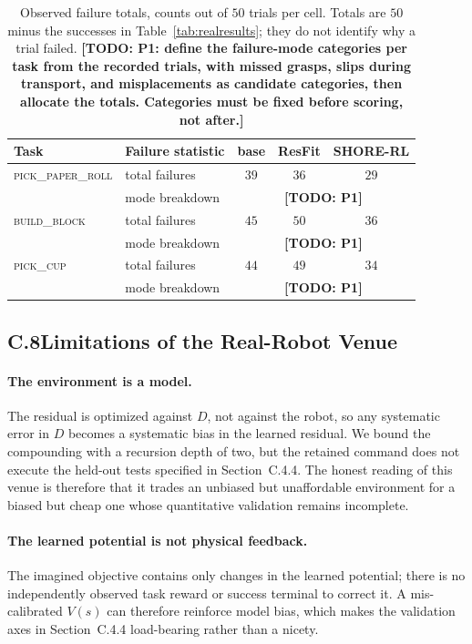 \documentclass[letterpaper]{article} %
\newcommand{\todo}[1]{\textbf{[TODO: #1]}}
\begin{document}
\begin{table}[t]
\centering\scriptsize\setlength{\tabcolsep}{3pt}
\begin{tabular}{@{}llccc@{}}
\toprule
Task & Failure statistic & base & ResFit & \textbf{SHORE-RL} \\
\midrule
\textsc{pick\_paper\_roll} & total failures & $39$ & $36$ & $29$ \\
                             & mode breakdown & \multicolumn{3}{c}{\todo{P1}} \\
\textsc{build\_block}      & total failures & $45$ & $50$ & $36$ \\
                             & mode breakdown & \multicolumn{3}{c}{\todo{P1}} \\
\textsc{pick\_cup}         & total failures & $44$ & $49$ & $34$ \\
                             & mode breakdown & \multicolumn{3}{c}{\todo{P1}} \\
\bottomrule
\end{tabular}
\caption{Observed failure totals, counts out of $50$ trials per cell. Totals are
$50$ minus the successes in Table~\ref{tab:realresults}; they do not identify
why a trial failed. \todo{P1: define the failure-mode categories per task from
the recorded trials, with missed grasps, slips during transport, and
misplacements as candidate categories, then allocate the totals. Categories
must be fixed before scoring, not after.}}
\label{tab:failmodes}
\end{table}

\subsection{C.8\quad Limitations of the Real-Robot Venue}

\paragraph{The environment is a model.}
The residual is optimized against $D$, not against the robot, so any systematic
error in $D$ becomes a systematic bias in the learned residual. We bound the
compounding with a recursion depth of two, but the retained command does not
execute the held-out tests specified in Section~C.4.4. The honest reading of
this venue is therefore that it trades an unbiased but unaffordable environment
for a biased but cheap one whose quantitative validation remains incomplete.

\paragraph{The learned potential is not physical feedback.}
The imagined objective contains only changes in the learned potential; there is
no independently observed task reward or success terminal to correct it. A
mis-calibrated $V(s)$ can therefore reinforce model bias, which makes the
validation axes in Section~C.4.4 load-bearing rather than a nicety.
\end{document}

